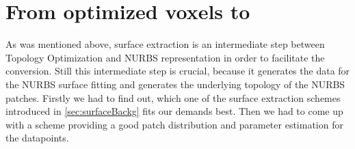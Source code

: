 \section{From optimized voxels to }
As was mentioned above, surface extraction is an intermediate step between Topology Optimization and \ac{NURBS} representation in order to facilitate the conversion. Still this intermediate step is crucial, because it generates the data for the \ac{NURBS} surface fitting and generates the underlying topology of the \ac{NURBS} patches.
Firstly we had to find out, which one of the surface extraction schemes introduced in \autoref{sec:surfaceBackg} fits our demands best. Then we had to come up with a scheme providing a good patch distribution and parameter estimation for the datapoints.




